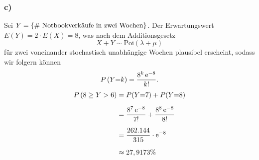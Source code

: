 \documentclass[main.tex]{subfiles}
\begin{document}
\subsubsection{c)}
Sei $Y = \{\text{\# Notbookverkäufe in zwei Wochen}\}$. Der Erwartungswert $E(Y) = 2\cdot E(X) = 8$, was nach dem Additionsgesetz $$
    X + Y \sim \text{Poi}(\lambda + \mu)
$$ für zwei voneinander stochastisch unabhängige Wochen plausibel erscheint, sodass wir folgern können
$$\begin{aligned}
    P\left(Y{=}k\right) = \frac{{8^k \operatorname{\mathrm{e}}^{-8}}}{{k!}}.
\end{aligned}$$
$$\begin{aligned}
    P\left(8\geq Y >6\right) &= P(Y{=}7) + P(Y{=}8)\\[2mm]
    &= \frac{8^7 \operatorname{\mathrm{e}}^{-8}}{7!} + \frac{8^8 \operatorname{\mathrm{e}}^{-8}}{8!} \\[2mm]
    &= \frac{262.144}{315} \cdot \operatorname{\mathrm{e}}^{-8} \\[2mm]
    &\approx 27,9173 \%
\end{aligned}$$
\end{document}
